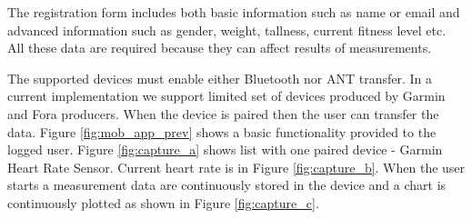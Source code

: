 \documentclass[a4paper,twoside]{article}
\begin{document}
The registration form includes both basic information such as name or email and advanced information such as gender, weight, tallness, current fitness level etc. All these data are required because they can affect results of measurements.

The supported devices must enable either Bluetooth nor ANT transfer. In a current implementation we support limited set of devices produced by Garmin and Fora producers. When the device is paired then the user can transfer the data. Figure \ref{fig:mob_app_prev} shows a basic functionality provided to the logged user. Figure \ref{fig:capture_a} shows list with one paired device - Garmin Heart Rate Sensor. Current heart rate is in Figure \ref{fig:capture_b}. When the user starts a measurement data are continuously stored in the device and a chart is continuously plotted as shown in Figure \ref{fig:capture_c}.
\end{document}
